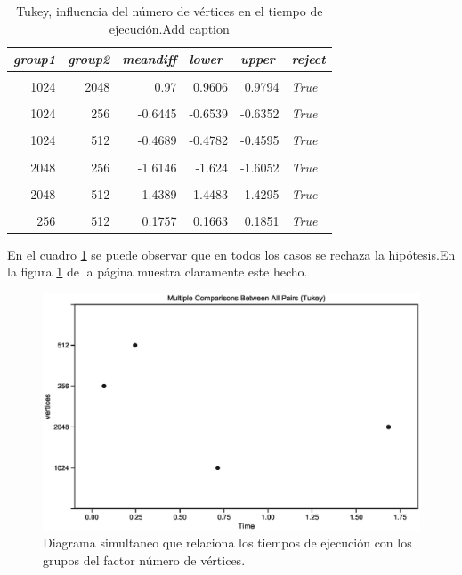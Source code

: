 \documentclass{article}
\begin{document}
\begin{table}[htbp]
  \centering
  \caption{Tukey, influencia del número de vértices en el tiempo de ejecución.Add caption}
    \begin{tabular}{rrrrrl}
    \toprule
    \multicolumn{1}{l}{\textit{\textbf{group1}}} & \multicolumn{1}{l}{\textit{\textbf{group2}}} & \multicolumn{1}{l}{\textit{\textbf{meandiff}}} & \multicolumn{1}{l}{\textit{\textbf{lower}}} & \multicolumn{1}{l}{\textit{\textbf{upper}}} & \textit{\textbf{reject}} \\
    \midrule
          &       &       &       &       &  \\
    1024  & 2048  & 0.97  & 0.9606 & 0.9794 & \textit{True} \\
          &       &       &       &       &  \\
    1024  & 256   & -0.6445 & -0.6539 & -0.6352 & \textit{True} \\
          &       &       &       &       &  \\
    1024  & 512   & -0.4689 & -0.4782 & -0.4595 & \textit{True} \\
          &       &       &       &       &  \\
    2048  & 256   & -1.6146 & -1.624 & -1.6052 & \textit{True} \\
          &       &       &       &       &  \\
    2048  & 512   & -1.4389 & -1.4483 & -1.4295 & \textit{True} \\
          &       &       &       &       &  \\
    256   & 512   & 0.1757 & 0.1663 & 0.1851 & \textit{True} \\
    \bottomrule
    \end{tabular}%
  \label{tab:t5}%
\end{table}%

En el cuadro \ref{tab:t5} se puede observar que en todos los casos se rechaza la hipótesis.En la figura \ref{fig7} de la página \pageref{fig7} muestra claramente este hecho.
\begin{center}
\begin{figure}[htbp]
\includegraphics[scale=0.6]{simultaneoustukeyvertices.eps}
\caption{Diagrama simultaneo que relaciona los tiempos de ejecución con los grupos del factor número de vértices.}
\label{fig7}
\end{figure}
\end{center}
\end{document}

